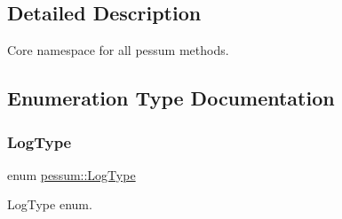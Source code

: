 \subsection{Detailed Description}
Core namespace for all pessum methods. 

\subsection{Enumeration Type Documentation}
\mbox{\label{namespacepessum_a0e205f64abc046e94dd38be906430664}} 
\subsubsection{\texorpdfstring{Log\+Type}{LogType}}
{\footnotesize\ttfamily enum \hyperlink{namespacepessum_a0e205f64abc046e94dd38be906430664}{pessum\+::\+Log\+Type}}



Log\+Type enum. 

